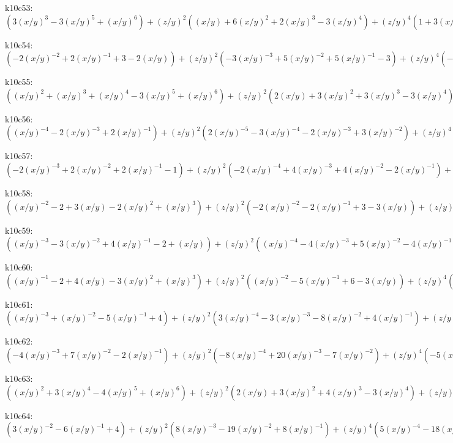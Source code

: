 k10c53: $ (3(x/y)^{3}-3(x/y)^{5}+(x/y)^{6})  +(z/y)^{2}((x/y)+6(x/y)^{2}+2(x/y)^{3}-3(x/y)^{4})  +(z/y)^{4}(1+3(x/y)+2(x/y)^{2}) $ 

k10c54: $ (-2(x/y)^{-2}+2(x/y)^{-1}+3-2(x/y))  +(z/y)^{2}(-3(x/y)^{-3}+5(x/y)^{-2}+5(x/y)^{-1}-3)  +(z/y)^{4}(-(x/y)^{-4}+4(x/y)^{-3}+4(x/y)^{-2}-(x/y)^{-1})  +(z/y)^{6}((x/y)^{-4}+(x/y)^{-3}) $ 

k10c55: $ ((x/y)^{2}+(x/y)^{3}+(x/y)^{4}-3(x/y)^{5}+(x/y)^{6})  +(z/y)^{2}(2(x/y)+3(x/y)^{2}+3(x/y)^{3}-3(x/y)^{4})  +(z/y)^{4}(1+2(x/y)+2(x/y)^{2}) $ 

k10c56: $ ((x/y)^{-4}-2(x/y)^{-3}+2(x/y)^{-1})  +(z/y)^{2}(2(x/y)^{-5}-3(x/y)^{-4}-2(x/y)^{-3}+3(x/y)^{-2})  +(z/y)^{4}((x/y)^{-6}-3(x/y)^{-5}-3(x/y)^{-4}+(x/y)^{-3})  +(z/y)^{6}(-(x/y)^{-6}-(x/y)^{-5}) $ 

k10c57: $ (-2(x/y)^{-3}+2(x/y)^{-2}+2(x/y)^{-1}-1)  +(z/y)^{2}(-2(x/y)^{-4}+4(x/y)^{-3}+4(x/y)^{-2}-2(x/y)^{-1})  +(z/y)^{4}(-(x/y)^{-5}+3(x/y)^{-4}+3(x/y)^{-3}-(x/y)^{-2})  +(z/y)^{6}((x/y)^{-5}+(x/y)^{-4}) $ 

k10c58: $ ((x/y)^{-2}-2+3(x/y)-2(x/y)^{2}+(x/y)^{3})  +(z/y)^{2}(-2(x/y)^{-2}-2(x/y)^{-1}+3-3(x/y))  +(z/y)^{4}((x/y)^{-2}+2(x/y)^{-1}) $ 

k10c59: $ ((x/y)^{-3}-3(x/y)^{-2}+4(x/y)^{-1}-2+(x/y))  +(z/y)^{2}((x/y)^{-4}-4(x/y)^{-3}+5(x/y)^{-2}-4(x/y)^{-1}+1)  +(z/y)^{4}(-2(x/y)^{-4}+3(x/y)^{-3}-2(x/y)^{-2})  +(x/y)^{-4}(z/y)^{6} $ 

k10c60: $ ((x/y)^{-1}-2+4(x/y)-3(x/y)^{2}+(x/y)^{3})  +(z/y)^{2}((x/y)^{-2}-5(x/y)^{-1}+6-3(x/y))  +(z/y)^{4}((x/y)^{-3}-3(x/y)^{-2}+3(x/y)^{-1})  -(x/y)^{-3}(z/y)^{6} $ 

k10c61: $ ((x/y)^{-3}+(x/y)^{-2}-5(x/y)^{-1}+4)  +(z/y)^{2}(3(x/y)^{-4}-3(x/y)^{-3}-8(x/y)^{-2}+4(x/y)^{-1})  +(z/y)^{4}((x/y)^{-5}-4(x/y)^{-4}-5(x/y)^{-3}+(x/y)^{-2})  +(z/y)^{6}(-(x/y)^{-5}-(x/y)^{-4}) $ 

k10c62: $ (-4(x/y)^{-3}+7(x/y)^{-2}-2(x/y)^{-1})  +(z/y)^{2}(-8(x/y)^{-4}+20(x/y)^{-3}-7(x/y)^{-2})  +(z/y)^{4}(-5(x/y)^{-5}+18(x/y)^{-4}-5(x/y)^{-3})  +(z/y)^{6}(-(x/y)^{-6}+7(x/y)^{-5}-(x/y)^{-4})  +(x/y)^{-6}(z/y)^{8} $ 

k10c63: $ ((x/y)^{2}+3(x/y)^{4}-4(x/y)^{5}+(x/y)^{6})  +(z/y)^{2}(2(x/y)+3(x/y)^{2}+4(x/y)^{3}-3(x/y)^{4})  +(z/y)^{4}(1+2(x/y)+2(x/y)^{2}) $ 

k10c64: $ (3(x/y)^{-2}-6(x/y)^{-1}+4)  +(z/y)^{2}(8(x/y)^{-3}-19(x/y)^{-2}+8(x/y)^{-1})  +(z/y)^{4}(5(x/y)^{-4}-18(x/y)^{-3}+5(x/y)^{-2})  +(z/y)^{6}((x/y)^{-5}-7(x/y)^{-4}+(x/y)^{-3})  -(x/y)^{-5}(z/y)^{8} $ 

